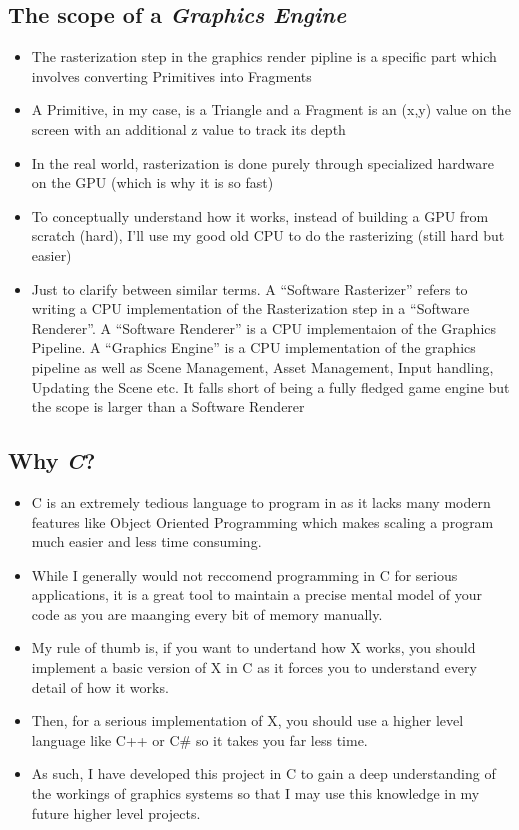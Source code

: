 \documentclass{article}
\begin{document}
\subsection{The scope of a \textit{Graphics Engine}}
\begin{itemize}
\item The rasterization step in the graphics render pipline is a specific part which involves converting Primitives into Fragments
\item A Primitive, in my case, is a Triangle and a Fragment is an (x,y) value on the screen with an additional z value to track its depth
\item In the real world, rasterization is done purely through specialized hardware on the GPU (which is why it is so fast)
\item To conceptually understand how it works, instead of building a GPU from scratch (hard), I'll use my good old CPU to do the rasterizing (still hard but easier)
\item Just to clarify between similar terms. A ``Software Rasterizer'' refers to writing a CPU implementation of the Rasterization step in a ``Software Renderer''. A ``Software Renderer'' is a CPU implementaion of the Graphics Pipeline. A ``Graphics Engine'' is a CPU implementation of the graphics pipeline as well as Scene Management, Asset Management, Input handling, Updating the Scene etc. It falls short of being a fully fledged game engine but the scope is larger than a Software Renderer
\end{itemize}

\subsection{Why \textit{C}?}
\begin{itemize}
\item  C is an extremely tedious language to program in as it lacks many modern features like Object Oriented Programming which makes scaling a program much easier and less time consuming. 
\item While I generally would not reccomend programming in C for serious applications, it is a great tool to maintain a precise mental model of your code as you are maanging every bit of memory manually. 
\item My rule of thumb is, if you want to undertand how X works, you should implement a basic version of X in C as it forces you to understand every detail of how it works.
\item Then, for a serious implementation of X, you should use a higher level language like C++ or C\# so it takes you far less time.
\item As such, I have developed this project in C to gain a deep understanding of the workings of graphics systems so that I may use this knowledge in my future higher level projects.
\end{itemize}
\end{document}
